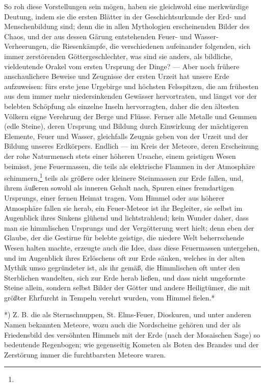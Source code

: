 \documentclass[a4paper, 11pt, oneside, polutonikogreek, german]{article}
\begin{document}
So roh diese Vorstellungen sein mögen, haben sie gleichwohl eine merkwürdige Deutung, indem sie die ersten Blätter in der Geschichtsurkunde der Erd- und Menschenbildung sind; denn die in allen Mythologien erscheinenden Bilder des Chaos, und der aus dessen Gärung entstehenden Feuer- und Wasser-Verheerungen, die Riesenkämpfe, die verschiedenen aufeinander folgenden, sich immer zerstörenden Göttergeschlechter, was sind sie anders, als bildliche, vieldeutende Orakel vom ersten Ursprung der Dinge? --- Aber noch frühere anschaulichere Beweise und Zeugnisse der ersten Urzeit hat unsere Erde aufzuweisen: fürs erste jene Urgebirge und höchsten Felsspitzen, die am frühesten aus dem immer mehr niedersinkenden Gewässer hervortraten, und längst vor der belebten Schöpfung als einzelne Inseln hervorragten, daher die den ältesten Völkern eigne Verehrung der Berge und Flüsse. Ferner alle Metalle und Gemmen (edle Steine), deren Ursprung und Bildung durch Einwirkung der mächtigeren Elemente, Feuer und Wasser, gleichfalls Zeugnis geben von der Urzeit und der Bildung unseres Erdkörpers. Endlich --- im Kreis der Meteore, deren Erscheinung der rohe Naturmensch stets einer höheren Ursache, einem geistigen Wesen beimisst, jene Feuermassen, die teils als elektrische Flammen in der Atmosphäre schimmern,\footnote{} teils als größere oder kleinere Steinmassen zur Erde fallen, und, ihrem äußeren sowohl als inneren Gehalt nach, Spuren eines fremdartigen Ursprungs, einer fernen Heimat tragen. Vom Himmel oder aus höherer Atmosphäre fallen sie herab, ein Feuer-Meteor ist ihr Begleiter, sie selbst im Augenblick ihres Sinkens glühend und lichtstrahlend; kein Wunder daher, dass man sie himmlischen Ursprungs und der Vergötterung wert hielt; denn eben der Glaube, der die Gestirne für belebte geistige, die niedere Welt beherrschende Wesen halten machte, erzeugte auch die Idee, dass diese Feuermassen untergehen, und im Augenblick ihres Erlöschens oft zur Erde sänken, welches in der alten Mythik umso gegründeter ist, als ihr gemäß, die Himmlischen oft unter den Sterblichen wandelten, sich zur Erde herab ließen, und dass nicht ungeformte Steine allein, sondern selbst Bilder der Götter und andere Heiligtümer, die mit größter Ehrfurcht in Tempeln verehrt wurden, vom Himmel fielen.*

*) Z. B. die als Sternschnuppen, St. Elms-Feuer, Dioskuren, und unter anderen Namen bekannten Meteore, wozu auch die Nordscheine gehören und der als Friedensbild des versöhnten Himmels mit der Erde (nach der Mosaischen Sage) so bedeutende Regenbogen; wie gegenseitig Kometen als Boten des Brandes und der Zerstörung immer die furchtbarsten Meteore waren.
\end{document}
